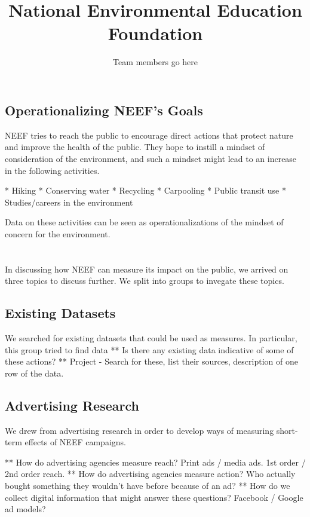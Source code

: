 \documentclass{article}
\title{National Environmental Education Foundation}
\author{Team members go here}
\begin{document}
\maketitle
{}

\subsection{Operationalizing NEEF's Goals}
NEEF tries to reach the public to encourage direct actions that protect nature and improve the health of the public.
They hope to instill a mindset of consideration of the environment, and such a mindset might lead to an increase
in the following activities.

* Hiking
* Conserving water
* Recycling
* Carpooling
* Public transit use
* Studies/careers in the environment

Data on these activities can be seen as operationalizations of the mindset of concern for the environment.

\section{}
In discussing how NEEF can measure its impact on the public,
we arrived on three topics to discuss further.
We split into groups to invegate these topics.

\subsection{Existing Datasets}
We searched for existing datasets that could be used as measures.
In particular, this group tried to find data 
** Is there any existing data indicative of some of these actions?
** Project - Search for these, list their sources, description of one row of the data.

\subsection{Advertising Research}
We drew from advertising research in order to develop ways of measuring
short-term effects of NEEF campaigns.

** How do advertising agencies measure reach?  Print ads / media ads.  1st order / 2nd order reach.
** How do advertising agencies measure action?  Who actually bought something they wouldn't have before because of an ad?
** How do we collect digital information that might answer these questions?  Facebook / Google ad models?
\end{document}
